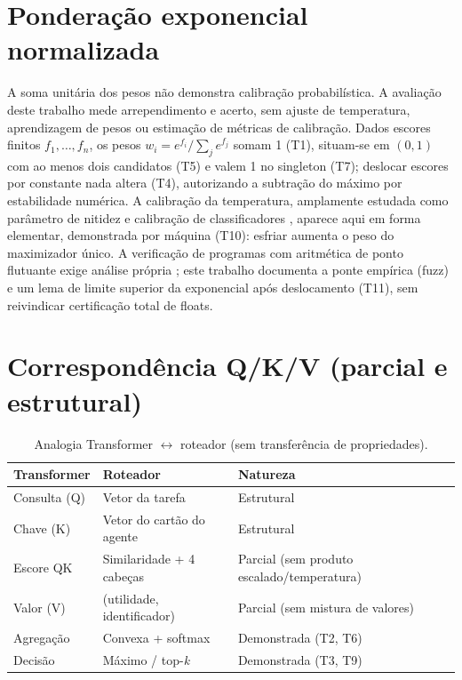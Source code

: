 \documentclass[12pt,openany,oneside,a4paper,brazil,chapter=TITLE]{abntex2}
\let\cite\citep
\begin{document}
\section{Ponderação exponencial normalizada}
A soma unitária dos pesos não demonstra calibração probabilística. A avaliação deste trabalho mede arrependimento e acerto, sem ajuste de temperatura, aprendizagem de pesos ou estimação de métricas de calibração.
Dados escores finitos $f_1,\dots,f_n$, os pesos $w_i=e^{f_i}/\sum_j e^{f_j}$ somam 1 (T1), situam-se em $(0,1)$ com ao menos dois candidatos (T5) e valem 1 no singleton (T7); deslocar escores por constante nada altera (T4), autorizando a subtração do máximo por estabilidade numérica. A calibração da temperatura, amplamente estudada como parâmetro de nitidez e calibração de classificadores \cite{komisarenko2024,xuan2025,xie2024}, aparece aqui em forma elementar, demonstrada por máquina (T10): esfriar aumenta o peso do maximizador único. A verificação de programas com aritmética de ponto flutuante exige análise própria \cite{bagnara2019,murray2026}; este trabalho documenta a ponte empírica (fuzz) e um lema de limite superior da exponencial após deslocamento (T11), sem reivindicar certificação total de floats.
\section{Correspondência Q/K/V (parcial e estrutural)}
\begin{table}[htbp]
\fontsize{10}{12}\selectfont\SingleSpacing
\centering
\caption{Analogia Transformer $\leftrightarrow$ roteador (sem transferência de propriedades).}
\label{tab:qkv}
\begin{tabularx}{\textwidth}{lXX}
\toprule
Transformer & Roteador & Natureza \\
\midrule
Consulta (Q) & Vetor da tarefa & Estrutural \\
Chave (K) & Vetor do cartão do agente & Estrutural \\
Escore QK & Similaridade + 4 cabeças & Parcial (sem produto escalado/temperatura) \\
Valor (V) & (utilidade, identificador) & Parcial (sem mistura de valores) \\
Agregação & Convexa + softmax & Demonstrada (T2, T6) \\
Decisão & Máximo / top-\textit{k} & Demonstrada (T3, T9) \\
\bottomrule
\end{tabularx}
\end{table}
\end{document}
